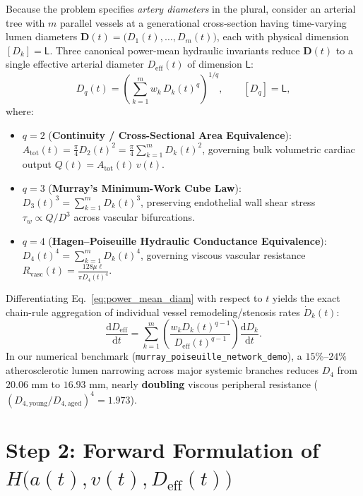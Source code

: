 \documentclass[11pt,a4paper]{article}
\newcommand{\dd}{\mathrm{d}}
\newcommand{\td}[2]{\frac{\dd #1}{\dd #2}}
\newcommand{\dimbr}[1]{\left[#1\right]}
\newcommand{\Deff}{D_{\mathrm{eff}}}
\begin{document}
Because the problem specifies \emph{artery diameters} in the plural, consider an arterial tree with $m$ parallel vessels at a generational cross-section having time-varying lumen diameters $\mathbf{D}(t) = \bigl(D_1(t), \dots, D_m(t)\bigr)$, each with physical dimension $\dimbr{D_k} = \mathsf{L}$. Three canonical power-mean hydraulic invariants reduce $\mathbf{D}(t)$ to a single effective arterial diameter $\Deff(t)$ of dimension $\mathsf{L}$:
\begin{equation}
  D_q(t) = \left(\sum_{k=1}^m w_k\, D_k(t)^q\right)^{1/q}, \qquad \dimbr{D_q} = \mathsf{L},
  \label{eq:power_mean_diam}
\end{equation}
where:
\begin{itemize}[leftmargin=1.5em,itemsep=2pt]
  \item $q = 2$ (\textbf{Continuity / Cross-Sectional Area Equivalence}): $A_{\mathrm{tot}}(t) = \frac{\pi}{4} D_2(t)^2 = \frac{\pi}{4}\sum_{k=1}^m D_k(t)^2$, governing bulk volumetric cardiac output $Q(t) = A_{\mathrm{tot}}(t)\,v(t)$.
  \item $q = 3$ (\textbf{Murray's Minimum-Work Cube Law}): $D_3(t)^3 = \sum_{k=1}^m D_k(t)^3$, preserving endothelial wall shear stress $\tau_w \propto Q / D^3$ across vascular bifurcations.
  \item $q = 4$ (\textbf{Hagen--Poiseuille Hydraulic Conductance Equivalence}): $D_4(t)^4 = \sum_{k=1}^m D_k(t)^4$, governing viscous vascular resistance $R_{\mathrm{vasc}}(t) = \frac{128\mu \ell}{\pi D_4(t)^4}$.
\end{itemize}
Differentiating Eq.~\eqref{eq:power_mean_diam} with respect to $t$ yields the exact chain-rule aggregation of individual vessel remodeling/stenosis rates $\dot{D}_k(t)$:
\begin{equation}
  \td{\Deff}{t} = \sum_{k=1}^m \left(\frac{w_k D_k(t)^{q-1}}{\Deff(t)^{q-1}}\right)\td{D_k}{t}.
  \label{eq:deff_rate}
\end{equation}
In our numerical benchmark (\texttt{murray\_poiseuille\_network\_demo}), a $15\%\text{--}24\%$ atherosclerotic lumen narrowing across major systemic branches reduces $D_4$ from $20.06\text{ mm}$ to $16.93\text{ mm}$, nearly \textbf{doubling} viscous peripheral resistance ($(D_{4,\mathrm{young}}/D_{4,\mathrm{aged}})^4 = 1.973$).

\section{Step 2: Forward Formulation of $H\bigl(a(t), v(t), \Deff(t)\bigr)$}
\end{document}
